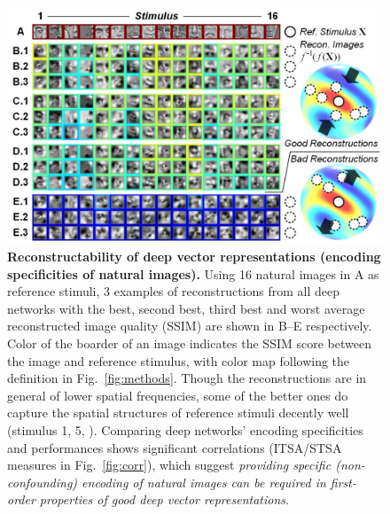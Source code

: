 \documentclass[10pt,twocolumn,letterpaper]{article}
\begin{document}
\begin{figure}
\begin{center}
\includegraphics[width=\columnwidth, trim=1em 0 1em 0]{Figs/pic4.jpg} 
\end{center}
\caption{{\bf Reconstructability of deep vector representations (\ie encoding specificities of natural images).}
Using 16 natural images in A as reference stimuli, 3 examples of reconstructions from all deep networks with the best, second best, third best and worst average reconstructed image quality (SSIM) are shown in B--E respectively.
Color of the boarder of an image indicates the SSIM score between the image and reference stimulus, with color map following the definition in Fig.~\ref{fig:methods}.
Though the reconstructions are in general of lower spatial frequencies, some of the better ones do capture the spatial structures of reference stimuli decently well (\eg stimulus 1, 5, \etc).
Comparing deep networks' encoding specificities and performances shows significant correlations (ITSA/STSA measures in Fig.~\ref{fig:corr}), which suggest \emph{providing specific (\ie non-confounding) encoding of natural images can be required in first-order properties of good deep vector representations}.
} %
\label{fig:encspc}
\end{figure}
\end{document}
